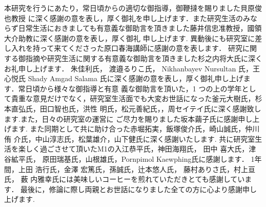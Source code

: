 \begin{shaji}
  \addcontentsline{}{}{}
 本研究を行うにあたり，常日頃からの適切な御指導，御鞭撻を賜りました貝原俊也教授
 に深く感謝の意を表し，厚く御礼を申し上げます．また研究生活のみならず日常生活におきましても有意義な御助言を頂きました藤井信忠准教授，國領大介助教に深く感謝の意を表し，厚く御礼 申し上げます.
 異動後にも研究室に差し入れを持って来てくださった原口春海講師に感謝の意を表します．
 研究に関する御指摘や研究生活に関する有意義な御助言を頂きました杉之内将大氏に深くお礼申し上げます．
朱佳利氏， 渡邉るりこ氏， Nikhanbayev Nursultan 氏，王心悦氏 Shady Amgad Salama
氏に深く感謝の意を表し，厚く御礼申し上げます．常日頃から様々な御指導と有意 義な御助言を頂いた，1 つの上の学年として貴重な意見だけでなく，研究室生活面でも大変お世話になった釜元大樹氏，杉本直弘氏，田口智也氏，洪性 明氏，松元善紀氏，，周セイテイ氏に深く感謝致します.また，日々の研究室の運営に ご尽力を賜りました坂本繭子氏に感謝申し上げます.
また同期として共に助け合った赤堀拓実，飯塚俊介氏，崎山誠氏，仲川侑 介氏，中山淳志氏，松葉雄介，山下健氏に深く感謝いたします.
共に研究室生活を楽しく過ごさせて頂いたM1の入江恭平氏，神田海翔氏， 田中 喜大氏，津谷絋平氏， 原田瑞基氏，山根雄氏，Pornpimol Kaewphing氏に感謝します．
1年間，上田 浩行氏，金澤 宏篤氏，孫誠氏，辻本悠人氏， 藤村ありさ氏，村上亘氏， 薮
内雅幸氏には美味しいコーヒーを煎れていただきとても感謝しています．
最後に，修論に際し両親とお世話になりました全ての方に心より感謝申し上げます. 
\end{shaji}


